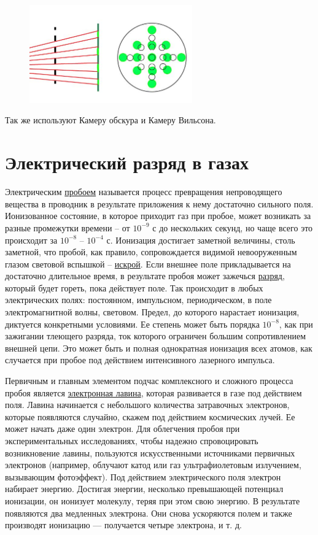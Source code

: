 \documentclass[10pt, a4paper]{article}
\let\stdsection\section
\renewcommand\section{\newpage\stdsection}
\begin{document}
\begin{figure}[ht]
	\begin{center}
		\includegraphics[width=70mm]{scintelator.JPG}
	\end{center}
\end{figure}

Так же используют Камеру обскура и Камеру Вильсона.

\section{Электрический разряд в газах}

Электрическим \uline{пробоем} называется процесс превращения непроводящего вещества в проводник в результате приложения к нему достаточно сильного поля. Ионизованное состояние, в которое приходит газ при пробое, может возникать за разные промежутки времени -- от $10^{-9}$ с до нескольких секунд, но чаще всего это происходит за $10^{-8}$ -- $10^{-4}$ с. Ионизация достигает заметной величины, столь заметной, что пробой, как правило, сопровождается видимой невооруженным глазом световой вспышкой -- \uline{искрой}. Если внешнее поле прикладывается на достаточно длительное время, в результате пробоя может зажечься \uline{разряд}, который будет гореть, пока действует поле. Так происходит в любых электрических полях: постоянном, импульсном, периодическом, в поле электромагнитной волны, световом. Предел, до которого нарастает ионизация, диктуется конкретными условиями. Ее степень может быть порядка $10^{-8}$, как при зажигании тлеющего разряда, ток которого ограничен большим сопротивлением внешней цепи. Это может быть и полная однократная ионизация всех атомов, как случается при пробое под действием интенсивного лазерного импульса.

Первичным и главным элементом подчас комплексного и сложного процесса пробоя является \uline{электронная лавина}, которая развивается в газе под действием поля. Лавина начинается с небольшого количества затравочных электронов, которые появляются случайно, скажем под действием космических лучей. Ее может начать даже один электрон. Для облегчения пробоя при экспериментальных исследованиях, чтобы надежно спровоцировать возникновение лавины, пользуются искусственными источниками первичных электронов (например, облучают катод или газ ультрафиолетовым излучением, вызывающим фотоэффект). Под действием электрического поля электрон набирает энергию. Достигая энергии, несколько превышающей потенциал ионизации, он ионизует молекулу, теряя при этом свою энергию. В результате появляются два медленных электрона. Они снова ускоряются полем и также производят ионизацию — получается четыре электрона, и т. д.
\end{document}

